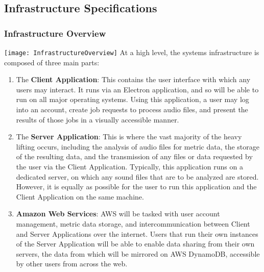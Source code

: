 \subsection{Infrastructure Specifications}

\subsubsection{Infrastructure Overview}
\texttt{[image: InfrastructureOverview]}
At a high level, the system\textquotesingle s infrastructure is composed of three main parts:
\begin{enumerate}
    \item The \textbf{Client Application}: This contains the user interface with which any users may interact. It runs via an Electron application, and so will be able to run on all major operating systems. Using this application, a user may log into an account, create job requests to process audio files, and present the results of those jobs in a visually accessible manner.
    \item The \textbf{Server Application}: This is where the vast majority of the heavy lifting occurs, including the analysis of audio files for metric data, the storage of the resulting data, and the transmission of any files or data requested by the user via the Client Application. Typically, this application runs on a dedicated server, on which any sound files that are to be analyzed are stored. However, it is equally as possible for the user to run this application and the Client Application on the same machine.
    \item \textbf{Amazon Web Services}: AWS will be tasked with user account management, metric data storage, and intercommunication between Client and Server Applications over the internet. Users that run their own instances of the Server Application will be able to enable data sharing from their own servers, the data from which will be mirrored on AWS DynamoDB, accessible by other users from across the web.
\end{enumerate}

